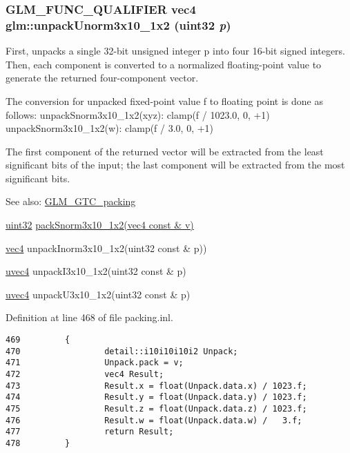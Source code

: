 \hypertarget{group__gtc__packing_gf69ace2b5e9234f8afb4e99c3df1193d}{
\subsubsection[unpackUnorm3x10\_\-1x2]{\setlength{\rightskip}{0pt plus 5cm}GLM\_\-FUNC\_\-QUALIFIER vec4 glm::unpackUnorm3x10\_\-1x2 (uint32 {\em p})}}
\label{group__gtc__packing_gf69ace2b5e9234f8afb4e99c3df1193d}


First, unpacks a single 32-bit unsigned integer p into four 16-bit signed integers. Then, each component is converted to a normalized floating-point value to generate the returned four-component vector.

The conversion for unpacked fixed-point value f to floating point is done as follows: unpackSnorm3x10\_\-1x2(xyz): clamp(f / 1023.0, 0, +1) unpackSnorm3x10\_\-1x2(w): clamp(f / 3.0, 0, +1)

The first component of the returned vector will be extracted from the least significant bits of the input; the last component will be extracted from the most significant bits.

\begin{Desc}
\item[See also:]\hyperlink{group__gtc__packing}{GLM\_\-GTC\_\-packing} 

\hyperlink{group__gtc__type__precision_g202b6a53c105fcb7e531f9b443518451}{uint32} \hyperlink{group__gtc__packing_g0d4157cec37c0312216a7be1cc92df54}{packSnorm3x10\_\-1x2(vec4 const \& v)} 

\hyperlink{group__core__types_g5881b1b022d7fd1b7218f5916532dd02}{vec4} unpackInorm3x10\_\-1x2(uint32 const \& p)) 

\hyperlink{group__core__types_g1c426d19627b32b14f0089f7f4ba7b1d}{uvec4} unpackI3x10\_\-1x2(uint32 const \& p) 

\hyperlink{group__core__types_g1c426d19627b32b14f0089f7f4ba7b1d}{uvec4} unpackU3x10\_\-1x2(uint32 const \& p) \end{Desc}


Definition at line 468 of file packing.inl.

\begin{Code}\begin{verbatim}469         {
470                 detail::i10i10i10i2 Unpack;
471                 Unpack.pack = v;
472                 vec4 Result;
473                 Result.x = float(Unpack.data.x) / 1023.f;
474                 Result.y = float(Unpack.data.y) / 1023.f;
475                 Result.z = float(Unpack.data.z) / 1023.f;
476                 Result.w = float(Unpack.data.w) /   3.f;
477                 return Result;
478         }
\end{verbatim}
\end{Code}


